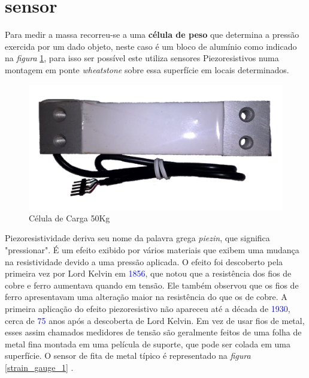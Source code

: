 \section{sensor}
Para medir a massa recorreu-se a uma \textbf{célula de peso} que determina a pressão exercida por um dado objeto, neste caso é um bloco de alumínio como indicado na \textit{figura} \ref{Load_Cell_1}, para isso ser possível este utiliza sensores Piezoresistivos numa montagem em ponte \textit{wheatstone} sobre essa superfície em locais determinados.
\\
\begin{figure}[H]
	\captionsetup{justification=raggedright,singlelinecheck=false}
	\flushleft
	\includegraphics[scale=0.15]{./image/PESTA/material/Load_Cell_1.jpg}
	\caption{Célula de Carga 50Kg}
	\label{Load_Cell_1}
\end{figure}
Piezoresistividade deriva seu nome da palavra grega \textit{piezin}, que significa "pressionar". É um efeito exibido por vários materiais que exibem uma mudança na resistividade devido a uma pressão aplicada. O efeito foi descoberto pela primeira vez por Lord Kelvin em \textcolor{blue}{1856}, que notou que a resistência dos fios de cobre e ferro aumentava quando em tensão. Ele também observou que os fios de ferro apresentavam uma alteração maior na resistência do que os de cobre. A primeira aplicação do efeito piezoresistivo não apareceu até a década de \textcolor{blue}{1930}, cerca de \textcolor{blue}{75} anos após a descoberta de Lord Kelvin. Em vez de usar fios de metal, esses assim chamados medidores de tensão são geralmente feitos de uma folha de metal fina montada em uma película de suporte, que pode ser colada em uma superfície. O sensor de fita de metal típico é representado na \textit{figura} \ref{strain_gauge_1} \cite{book-9}.
\\
\\
